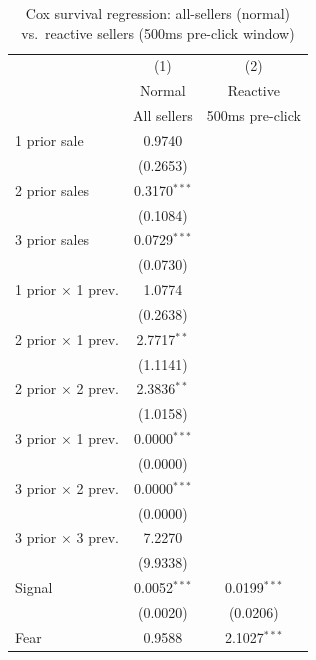 
\begin{table}[!htbp]
\centering
\caption{Cox survival regression: all-sellers (normal) vs.\ reactive sellers (500ms pre-click window)} \label{tab:cox_normal_vs_reactive}
\begin{minipage}{\textwidth}
\centering
\scriptsize
\renewcommand{\arraystretch}{0.9}
\begin{tabular*}{\textwidth}{@{\extracolsep{\fill}} l c c @{\hspace{4em}}}
   \toprule \toprule
   & (1) & (2) \\
   & Normal & Reactive \\
   & All sellers & 500ms pre-click \\
   \midrule
   1 prior sale              & 0.9740 &  \\
                             & (0.2653) &  \\
   2 prior sales             & 0.3170$^{***}$ &  \\
                             & (0.1084) &  \\
   3 prior sales             & 0.0729$^{***}$ &  \\
                             & (0.0730) &  \\
   1 prior $\times$ 1 prev.  & 1.0774 &  \\
                             & (0.2638) &  \\
   2 prior $\times$ 1 prev.  & 2.7717$^{**}$ &  \\
                             & (1.1141) &  \\
   2 prior $\times$ 2 prev.  & 2.3836$^{**}$ &  \\
                             & (1.0158) &  \\
   3 prior $\times$ 1 prev.  & 0.0000$^{***}$ &  \\
                             & (0.0000) &  \\
   3 prior $\times$ 2 prev.  & 0.0000$^{***}$ &  \\
                             & (0.0000) &  \\
   3 prior $\times$ 3 prev.  & 7.2270 &  \\
                             & (9.9338) &  \\
   Signal                    & 0.0052$^{***}$ & 0.0199$^{***}$ \\
                             & (0.0020) & (0.0206) \\
   Fear                      & 0.9588 & 2.1027$^{***}$ \\

\end{tabular*}
\end{minipage}
\end{table}
